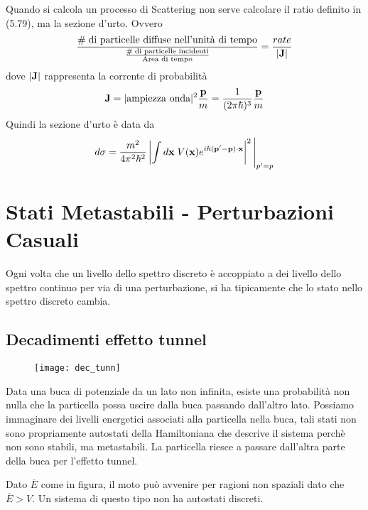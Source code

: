  Quando si calcola un processo di Scattering non serve calcolare il ratio definito in (5.79), ma la sezione d'urto. Ovvero 
 \begin{equation*}
 	\frac{\#\; \text{di particelle diffuse nell'unit\`a di tempo}}{\frac{\# \; \text{di particelle incidenti}}{\text{Area di tempo}}} = \frac{rate}{|\bold{J}|}
 \end{equation*}
 dove $|\bold{J}|$ rappresenta la corrente di probabilit\`a 
 \begin{equation*}
 	\bold{J} = |\text{ampiezza onda}|^2 \frac{\bold{p}}{m} = \frac{1}{(2 \pi\hbar)^3} \frac{\bold{p}}{m}
 \end{equation*}
 Quindi la sezione d'urto \`e data da
 \begin{equation}
 	d \sigma = \frac{m^2}{4 \pi^2 \hbar^2}\left |\int d\bold{x} \; V(\bold{x})e^{i\hbar (\bold{p}'-\bold{p}) \cdot \bold{x}}\right|^2 \Bigg |_{p'=p}
 \end{equation}
 \newpage
 
 \section{Stati Metastabili - Perturbazioni Casuali}
 Ogni volta che un livello dello spettro discreto \`e accoppiato a dei livello dello spettro continuo per via di una perturbazione, si ha tipicamente che lo stato nello spettro discreto cambia.
 
 \subsection{Decadimenti effetto tunnel}
 \begin{wrapfigure}{r}{0.4\textwidth}
    \centering
    \texttt{[image: dec\_tunn]} %
\end{wrapfigure}
Data una buca di potenziale da un lato non infinita, esiste una probabilit\`a non nulla che la particella possa uscire dalla buca passando dall'altro lato. Possiamo immaginare dei livelli energetici associati alla particella nella buca, tali stati non sono propriamente autostati della Hamiltoniana che descrive il sistema perch\`e non sono stabili, ma metastabili. La particella riesce a passare dall'altra parte della buca per l'effetto tunnel. 

Dato $\overline{E}$ come in figura, il moto pu\`o avvenire per ragioni non spaziali dato che $\overline{E} >V$. Un sistema di questo tipo non ha autostati discreti.


